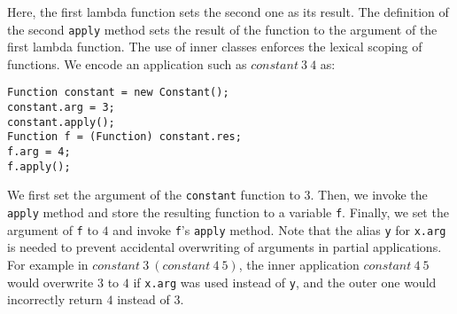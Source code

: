\noindent Here, the first lambda function sets the second one as its result.
The definition of the second \lstinline{apply} method
sets the result of the function to the argument of the first lambda
function. The use of inner classes enforces the lexical scoping of functions.
 We encode an application such as $constant~3~4$ as:

\begin{lstlisting}
Function constant = new Constant();
constant.arg = 3;
constant.apply();
Function f = (Function) constant.res;
f.arg = 4;
f.apply();
\end{lstlisting}

\noindent We first set the argument of the \lstinline{constant} function to $3$. Then,
we invoke the \lstinline{apply} method and store the
resulting function to a variable \lstinline{f}. Finally, we set the
argument of \lstinline{f} to $4$ and invoke \lstinline{f}'s
\lstinline{apply} method.
Note that the alias \lstinline{y} for \lstinline{x.arg} is needed to prevent accidental
overwriting of arguments in partial applications. For example in 
$constant~3~(constant~4~5)$, the inner application $constant~4~5$ would overwrite
$3$ to $4$ if \lstinline{x.arg} was used instead of \lstinline{y},
 and the outer one would incorrectly return $4$ instead of $3$.
\begin{comment}
An alternative way to encode $constant$ is:

\begin{lstlisting}
static class Constant2 extends Function
{
    Function x = this;
    {
        res = new Function() {
            void apply() { res = x.arg; }
        };
    }
    public void apply () {}
}
\end{lstlisting}

\noindent Differently from the previous definition, we set the first
\lstinline{res} field when
initializing \lstinline{constant2}, instead of only after we invoke the
\lstinline{apply} method. This
approach has two benefits: 1) when we create \lstinline{constant2}, the 
second lambda is also initialized; 2) because the
\lstinline{apply} method of the first lambda function becomes 
empty, it is redundant to call it. Therefore, as a consequence of 2), 
the invocation $constant~3~4$ becomes:

\begin{lstlisting}
Function constant2 = new Constant2();
constant2.arg = 3;
// no call needed here
Function g = (Function) constant2.res;
g.arg = 4;
g.apply();
\end{lstlisting}

\noindent Instead of two \lstinline{apply} method calls, we only need one call.
This alternative encoding can improve 
memory and time performance of multi-argument functions. It is especially important
in recursive multi-argument functions. 
With the first encoding, those functions create new
\lstinline{Function} objects on every recursive call and require
multiple \lstinline{apply} methods. This is exactly the same
deficiency as of the FAO encoding. However, the alternative encoding 
avoids these problems.
\end{comment}

